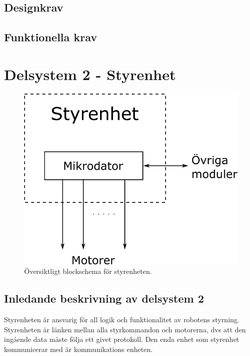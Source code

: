 \documentclass[a4paper,11pt]{article}
\begin{document}
\subsection{Designkrav}
\begin{LIPSkravlista}
\end{LIPSkravlista}

\subsection{Funktionella krav}
\begin{LIPSkravlista}
\end{LIPSkravlista}

\section{Delsystem 2 - Styrenhet}
\begin{figure}[h!]
\centering
\includegraphics[scale=1]{styrenhet.png}
\caption{Översiktligt blockschema för styrenheten.}
\end{figure}


\subsection{Inledande beskrivning av delsystem 2}
Styrenheten är ansvarig för all logik och funktionalitet av robotens styrning. Styrenheten är länken mellan alla styrkommandon och motorerna, dvs att den ingående data måste följa ett givet protokoll. Den enda enhet som styrenhet kommunicerar med är kommunikations enheten.
\end{document}

